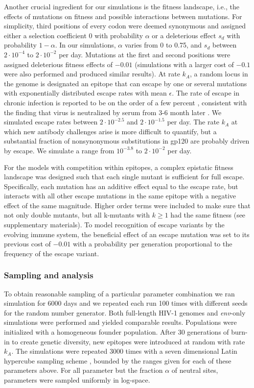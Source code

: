 \documentclass[11pt]{article}
\newcommand{\env}{\textit{env}}
\begin{document}
Another crucial ingredient for our simulations is the fitness landscape,
i.e., the effects of mutations on fitness and possible interactions
between mutations. For simplicity, third positions of every codon were
deemed synonymous and assigned either a selection coefficient $0$ with
probability $\alpha$ or a deleterious effect $s_d$ with probability
$1-\alpha$. In our simulations, $\alpha$ varies from 0 to 0.75,
and $s_d$ between $2 \cdot 10^{-4}$ to $2\cdot 10^{-2}$ per day.
Mutations at the first and second positions were assigned deleterious 
fitness effects of $-0.01$ (simulations with a larger cost of $-0.1$ were also
performed and produced similar results). At 
rate $k_A$, a random locus in the genome is designated an epitope that can
escape by one or several mutations with exponentially distributed escape rates
with mean $\epsilon$. The rate of escape in chronic infection is
reported to be on the order of a few percent
\citep{Asquith:2006p28003,moore_limited_2009}, consistent with the
finding that virus is neutralized by serum from 3-6 month later
\citep{richman_rapid_2003}. We simulated escape rates between $2 \cdot
10^{-2.5}$ and $2 \cdot 10^{-1.5}$ per day. 
The rate $k_A$ at which new antibody challenges arise is more difficult to
quantify, but a substantial fraction of nonsynonymous substitutions in gp120 are
probably driven by escape. We simulate a range from $10^{-3.8}$ to $2\cdot 10^{-2}$ per day.

For the models with competition within epitopes, a complex epistatic fitness
landscape was designed such that each single mutant is sufficient for full
escape. Specifically, each mutation has an additive effect equal to the
escape rate, but interacts with all other escape mutations in the same
epitope with a negative effect of the same magnitude. 
Higher order terms were included to make sure that not
only double mutants, but all k-mutants with $k \geq 1$ had the same fitness (see
supplementary materials). To model recognition of escape variants by the
evolving immune system, the beneficial effect of an escape mutation was set
to its previous cost of $-0.01$ with a probability per generation proportional to
the frequency of the escape variant.

\subsubsection*{Sampling and analysis}
To obtain reasonable sampling of a particular parameter combination we
ran simulation for 6000 days and we repeated each run 100 times with
different seeds for the random number generator. Both full-length HIV-1
genomes and \env{}-only simulations were performed and yielded
comparable results. Populations were initialized with a homogeneous
founder population. After 30 generations of burn-in to create
genetic diversity, new epitopes were introduced at random with rate
$k_A$. The simulations were repeated 3000 times with a seven dimensional
Latin hypercube sampling scheme \citep{mckay_comparison_1979}, bounded by the ranges
given for each of these parameters above. For all parameter but the
fraction $\alpha$ of neutral sites,  parameters were sampled uniformly in
log-space. 
\end{document}
